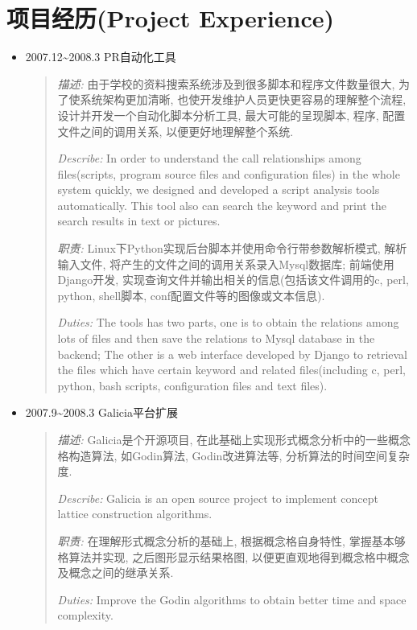 \documentclass[a4paper,10pt,english]{manual}
\begin{document}
\section{项目经历(Project Experience)}
\begin{itemize}
\item {} 
2007.12\textasciitilde{}2008.3 PR自动化工具
\begin{quote}

\emph{描述:} 由于学校的资料搜索系统涉及到很多脚本和程序文件数量很大, 为了使系统架构更加清晰, 也使开发维护人员更快更容易的理解整个流程, 设计并开发一个自动化脚本分析工具, 最大可能的呈现脚本, 程序, 配置文件之间的调用关系, 以便更好地理解整个系统.

\emph{Describe:} In order to understand the call relationships among files(scripts, program source files and configuration files) in the whole system quickly, we designed and developed a script analysis tools automatically. This tool also can search the keyword and print the search results in text or pictures.

\emph{职责:} Linux下Python实现后台脚本并使用命令行带参数解析模式, 解析输入文件, 将产生的文件之间的调用关系录入Mysql数据库; 前端使用Django开发, 实现查询文件并输出相关的信息(包括该文件调用的c, perl, python, shell脚本, conf配置文件等的图像或文本信息).

\emph{Duties:} The tools has two parts, one is to obtain the relations among lots of files and then save the relations to Mysql database in the backend; The other is a web interface developed by Django to retrieval the files which have certain keyword and related files(including c, perl, python, bash scripts, configuration files and text files).
\end{quote}

\item {} 
2007.9\textasciitilde{}2008.3 Galicia平台扩展
\begin{quote}

\emph{描述:} Galicia是个开源项目, 在此基础上实现形式概念分析中的一些概念格构造算法, 如Godin算法, Godin改进算法等, 分析算法的时间空间复杂度.

\emph{Describe:} Galicia is an open source project to implement concept lattice construction algorithms.

\emph{职责:} 在理解形式概念分析的基础上, 根据概念格自身特性, 掌握基本够格算法并实现, 之后图形显示结果格图, 以便更直观地得到概念格中概念及概念之间的继承关系.

\emph{Duties:} Improve the Godin algorithms to obtain better time and space complexity.
\end{quote}


\end{itemize}
\end{document}
